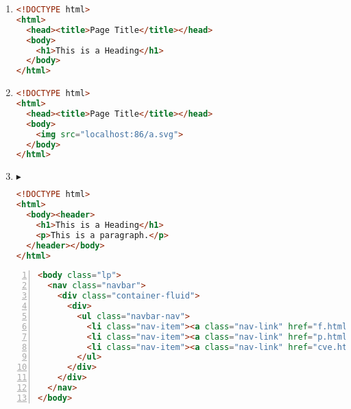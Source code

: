 \documentclass[a4paper,12pt]{article}
\begin{document}
\begin{enumerate}[label=\textbf{\arabic*.}]
\begin{enumerate}
		\item  \hfill \vspace*{-7mm}
    \begin{lstlisting}[language=HTML]
<!DOCTYPE html>
<html>
  <head><title>Page Title</title></head>
  <body>
    <h1>This is a Heading</h1>
  </body>
</html>
    \end{lstlisting}
    
		\item  \hfill \vspace*{-7mm}
    \begin{lstlisting}[language=HTML]
<!DOCTYPE html>
<html>
  <head><title>Page Title</title></head>
  <body>
    <img src="localhost:86/a.svg">
  </body>
</html>
    \end{lstlisting}
    
		\item $\blacktriangleright$  \hfill \vspace*{-7mm}
    \begin{lstlisting}[language=HTML]
<!DOCTYPE html> 
<html>
  <body><header>
    <h1>This is a Heading</h1>
    <p>This is a paragraph.</p>
  </header></body>
</html>
    \end{lstlisting}
    
	\end{enumerate}

\end{enumerate}

\newpage
\begin{lstlisting}[language=HTML, caption={Documento en HTML}, label={lst:1}, numbers=left]
<body class="lp">
  <nav class="navbar">
    <div class="container-fluid">
      <div>
        <ul class="navbar-nav">
          <li class="nav-item"><a class="nav-link" href="f.html">Info</a></li>
          <li class="nav-item"><a class="nav-link" href="p.html">Precios</a></li>
          <li class="nav-item"><a class="nav-link" href="cve.html">CVE</a></li>
        </ul>
      </div>
    </div>
  </nav>
</body>
\end{lstlisting}
\end{document}
